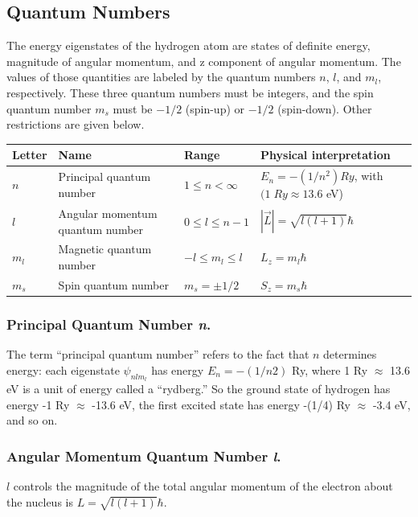 \documentclass[../../main.tex]{subfiles}
\begin{document}
\subsection{Quantum Numbers}
The energy eigenstates of the hydrogen atom are states of definite energy, magnitude of angular momentum, and z component of angular momentum. The values of those quantities are labeled by the quantum numbers $n$, $l$, and $m_l$, respectively. These three quantum numbers must be integers, and the spin quantum number $m_s$ must be $-1/2$ (spin-up) or $-1/2$ (spin-down). Other restrictions are given below.
\begin{center}
    \begin{tabular}{| p{} | p{} | p{} | p{}|}
        \hline
        Letter&Name&Range&Physical interpretation\\
        \hline
        $n$&Principal quantum number&$1 \leq n <\infty$&$E_n = -(1/n^2) Ry$, with $ (1 \;Ry \approx 13.6$ eV)\\
        $l$&Angular momentum quantum number&$0 \leq l \leq n - 1$ &$ |\overrightarrow{L}| = \sqrt{l(l + 1) }\hbar$\\
        $m_l$&Magnetic quantum number&$-l \leq m_l \leq l$&$L_z = m_l\hbar$\\
        $m_s$&Spin quantum number&$m_s = \pm 1/2$&$S_z = m_s\hbar$\\\hline
    \end{tabular}
\end{center}

\subsubsection{Principal Quantum Number \emph{n}.} The term “principal quantum number” refers to the fact that $n$ determines energy: each eigenstate $\psi_{nlm_l}$  has energy $E_n = -(1/n2)$ Ry, where 1 Ry $\approx$ 13.6 eV is a unit of energy called a “rydberg.” So the ground state of hydrogen has energy -1 Ry $\approx$ -13.6 eV, the first excited state has energy -(1/4) Ry $\approx$ -3.4 eV, and so on.

\subsubsection{Angular Momentum Quantum Number \emph{l}.} $l$ controls the magnitude of the total angular momentum of the electron about the nucleus is $L = \sqrt{l(l + 1)} \hbar$.
\end{document}

